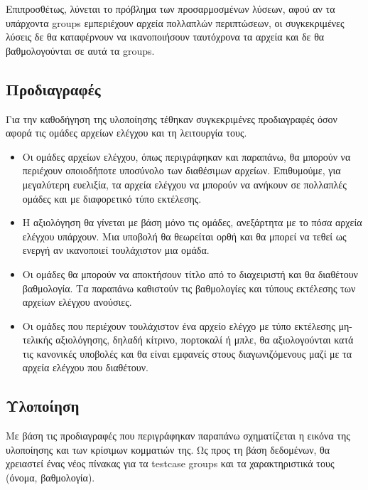 \documentclass[diploma]{softlab-thesis}
\begin{document}
\bigskip

Επιπροσθέτως, λύνεται το πρόβλημα των προσαρμοσμένων λύσεων, αφού αν τα
υπάρχοντα groups εμπεριέχουν αρχεία πολλαπλών περιπτώσεων, οι συγκεκριμένες
λύσεις δε θα καταφέρνουν να ικανοποιήσουν ταυτόχρονα τα αρχεία και δε θα
βαθμολογούνται σε αυτά τα groups.

\subsection{Προδιαγραφές}

Για την καθοδήγηση της υλοποίησης τέθηκαν συγκεκριμένες προδιαγραφές όσον
αφορά τις ομάδες αρχείων ελέγχου και τη λειτουργία τους.

\begin{itemize}

    \item Οι ομάδες αρχείων ελέγχου, όπως περιγράφηκαν και παραπάνω, θα μπορούν
      να περιέχουν οποιοδήποτε υποσύνολο των διαθέσιμων αρχείων. Επιθυμούμε,
      για μεγαλύτερη ευελιξία, τα αρχεία ελέγχου να μπορούν να ανήκουν σε
      πολλαπλές ομάδες και με διαφορετικό τύπο εκτέλεσης.

    \item Η αξιολόγηση θα γίνεται με βάση μόνο τις ομάδες, ανεξάρτητα με το
      πόσα αρχεία ελέγχου υπάρχουν. Μια υποβολή θα θεωρείται ορθή και θα μπορεί
      να τεθεί ως ενεργή αν ικανοποιεί τουλάχιστον μια ομάδα.

    \item Οι ομάδες θα μπορούν να αποκτήσουν τίτλο από το διαχειριστή και θα
      διαθέτουν βαθμολογία. Τα παραπάνω καθιστούν τις βαθμολογίες και τύπους
      εκτέλεσης των αρχείων ελέγχου ανούσιες.

    \item Οι ομάδες που περιέχουν τουλάχιστον ένα αρχείο ελέγχο με τύπο εκτέλεσης
      μη-τελικής αξιολόγησης, δηλαδή κίτρινο, πορτοκαλί ή μπλε, θα αξιολογούνται
      κατά τις κανονικές υποβολές και θα είναι εμφανείς στους διαγωνιζόμενους
      μαζί με τα αρχεία ελέγχου που διαθέτουν.

\end{itemize}

\subsection{Υλοποίηση}

Με βάση τις προδιαγραφές που περιγράφηκαν παραπάνω σχηματίζεται η εικόνα της
υλοποίησης και των κρίσιμων κομματιών της. Ως προς τη βάση δεδομένων, θα
χρειαστεί ένας νέος πίνακας για τα testcase groups και τα χαρακτηριστικά τους
(όνομα, βαθμολογία).
\end{document}
